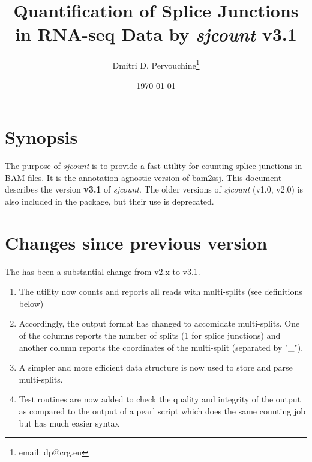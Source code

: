 \documentclass{article}
\begin{document}
\title{Quantification of Splice Junctions in RNA-seq Data by {\em sjcount} v3.1}

\author{Dmitri D. Pervouchine\thanks{email: dp@crg.eu}}

\date{\today}
\maketitle
\tableofcontents

\section{Synopsis}

The purpose of {\em sjcount} is to provide a fast utility for counting splice junctions in BAM files. 
It is the annotation-agnostic version of \href{https://github.com/pervouchine/bam2ssj}{bam2ssj}. 
This document describes the version {\bf v3.1} of {\em sjcount}. The older versions of {\em sjcount}
(v1.0, v2.0) is also included in the package, but their use is deprecated.

\section{Changes since previous version}
The has been a substantial change from v2.x to v3.1.
\begin{enumerate}
\item The utility now counts and reports all reads with multi-splits (see definitions below)
\item Accordingly, the output format has changed to accomidate multi-splits. One of the columns reports 
the number of splits (1 for splice junctions) and another column reports the coordinates of the multi-split (separated by "\_"). 
\item A simpler and more efficient data structure is now used to store and parse multi-splits.
\item Test routines are now added to check the quality and integrity of the output as compared to the output of 
a pearl script which does the same counting job but has much easier syntax
\end{enumerate}
\end{document}
